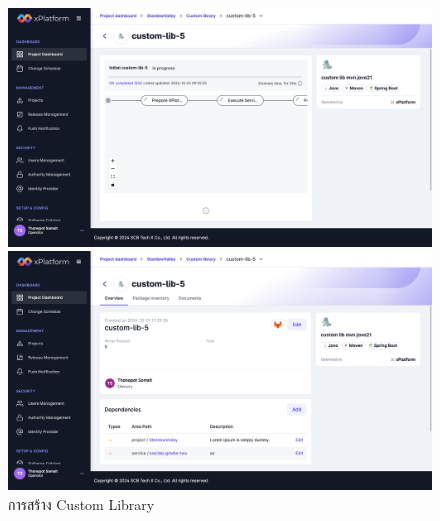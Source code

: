 \begin{figure}[H]
    \begin{center}
        \includegraphics[width=\linewidth]{resources/pages/custom-library/create-library/5.png}
    
        \vspace{1in}
    
        \includegraphics[width=\linewidth]{resources/pages/custom-library/create-library/6.png}
    \end{center}
    \caption[การสร้าง Custom Library]{การสร้าง Custom Library}
  \label{fig:create-library}
\end{figure}

\newpage
